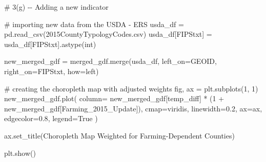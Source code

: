\documentclass[
  letterpaper,
  DIV=11,
  numbers=noendperiod]{scrartcl}
\newenvironment{Shaded}{\begin{snugshade}}{\end{snugshade}}
\newcommand{\BuiltInTok}[1]{\textcolor[rgb]{0.00,0.23,0.31}{#1}}
\newcommand{\CommentTok}[1]{\textcolor[rgb]{0.37,0.37,0.37}{#1}}
\newcommand{\DecValTok}[1]{\textcolor[rgb]{0.68,0.00,0.00}{#1}}
\newcommand{\FloatTok}[1]{\textcolor[rgb]{0.68,0.00,0.00}{#1}}
\newcommand{\NormalTok}[1]{\textcolor[rgb]{0.00,0.23,0.31}{#1}}
\newcommand{\OperatorTok}[1]{\textcolor[rgb]{0.37,0.37,0.37}{#1}}
\newcommand{\StringTok}[1]{\textcolor[rgb]{0.13,0.47,0.30}{#1}}
\newcommand{\VariableTok}[1]{\textcolor[rgb]{0.07,0.07,0.07}{#1}}
\begin{document}
\begin{Shaded}
\begin{Highlighting}[]
\CommentTok{\# 3(g) {-}{-} Adding a new indicator}

\CommentTok{\# importing new data from the USDA {-} ERS}
\NormalTok{usda\_df }\OperatorTok{=}\NormalTok{ pd.read\_csv(}\StringTok{\textquotesingle{}2015CountyTypologyCodes.csv\textquotesingle{}}\NormalTok{)}
\NormalTok{usda\_df[}\StringTok{\textquotesingle{}FIPStxt\textquotesingle{}}\NormalTok{] }\OperatorTok{=}\NormalTok{ usda\_df[}\StringTok{\textquotesingle{}FIPStxt\textquotesingle{}}\NormalTok{].astype(}\BuiltInTok{int}\NormalTok{)}

\NormalTok{new\_merged\_gdf }\OperatorTok{=}\NormalTok{ merged\_gdf.merge(usda\_df, left\_on}\OperatorTok{=}\StringTok{\textquotesingle{}GEOID\textquotesingle{}}\NormalTok{, right\_on}\OperatorTok{=}\StringTok{\textquotesingle{}FIPStxt\textquotesingle{}}\NormalTok{, how}\OperatorTok{=}\StringTok{\textquotesingle{}left\textquotesingle{}}\NormalTok{)}


\CommentTok{\# creating the choropleth map with adjusted weights}
\NormalTok{fig, ax }\OperatorTok{=}\NormalTok{ plt.subplots(}\DecValTok{1}\NormalTok{, }\DecValTok{1}\NormalTok{)}
\NormalTok{new\_merged\_gdf.plot(}
\NormalTok{    column}\OperatorTok{=}\NormalTok{ new\_merged\_gdf[}\StringTok{\textquotesingle{}temp\_diff\textquotesingle{}}\NormalTok{] }\OperatorTok{*}\NormalTok{ (}\DecValTok{1} \OperatorTok{+}\NormalTok{ new\_merged\_gdf[}\StringTok{\textquotesingle{}Farming\_2015\_Update\textquotesingle{}}\NormalTok{]),}
\NormalTok{    cmap}\OperatorTok{=}\StringTok{\textquotesingle{}viridis\textquotesingle{}}\NormalTok{,}
\NormalTok{    linewidth}\OperatorTok{=}\FloatTok{0.2}\NormalTok{,}
\NormalTok{    ax}\OperatorTok{=}\NormalTok{ax,}
\NormalTok{    edgecolor}\OperatorTok{=}\StringTok{\textquotesingle{}0.8\textquotesingle{}}\NormalTok{,}
\NormalTok{    legend}\OperatorTok{=}\VariableTok{True}
\NormalTok{)}

\NormalTok{ax.set\_title(}\StringTok{\textquotesingle{}Choropleth Map Weighted for Farming{-}Dependent Counties\textquotesingle{}}\NormalTok{)}

\NormalTok{plt.show()}
\end{Highlighting}
\end{Shaded}
\end{document}
